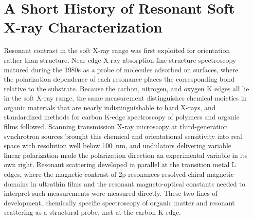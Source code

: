 \section{A Short History of Resonant Soft X-ray Characterization}\label{sec:a-short-history-of-resonant-soft-x-ray-characterization}

Resonant contrast in the soft X-ray range was first exploited for orientation rather than structure. Near edge X-ray absorption fine structure spectroscopy matured during the 1980s as a probe of molecules adsorbed on surfaces, where the polarization dependence of each resonance places the corresponding bond relative to the substrate.\autocite{stohrNEXAFSSpectroscopy1992} Because the carbon, nitrogen, and oxygen K edges all lie in the soft X-ray range, the same measurement distinguishes chemical moieties in organic materials that are nearly indistinguishable to hard X-rays, and standardized methods for carbon K-edge spectroscopy of polymers and organic films followed.\autocite{wattsMethodsCarbonKedge2006} Scanning transmission X-ray microscopy at third-generation synchrotron sources\autocite{bilderbackReviewThirdNext2005} brought this chemical and orientational sensitivity into real space with resolution well below \qty{100}{nm},\autocite{kilcoyneInterferometercontrolledScanningTransmission2003,adeNEXAFSMicroscopyResonant2008} and undulators delivering variable linear polarization made the polarization direction an experimental variable in its own right.\autocite{youngVariableLinearPolarization2002} Resonant scattering developed in parallel at the transition metal L edges, where the magnetic contrast of 2p resonances resolved chiral magnetic domains in ultrathin films\autocite{durrChiralMagneticDomain1999} and the resonant magneto-optical constants needed to interpret such measurements were measured directly.\autocite{kortrightResonantMagnetoopticalProperties2000} These two lines of development, chemically specific spectroscopy of organic matter and resonant scattering as a structural probe, met at the carbon K edge.

